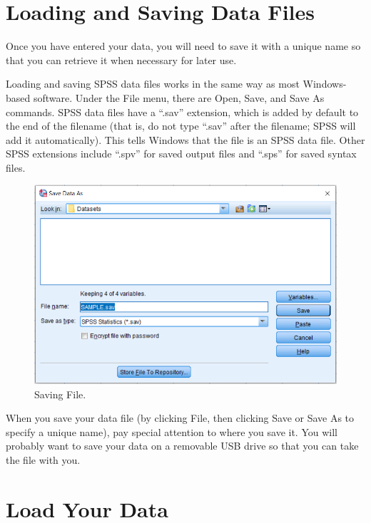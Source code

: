 \documentclass[
]{book}
\begin{document}
\hypertarget{loading-and-saving-data-files}{%
\section{Loading and Saving Data Files}\label{loading-and-saving-data-files}}

Once you have entered your data, you will need to save it with a unique name so that you can retrieve it when necessary for later use.

Loading and saving SPSS data files works in the same way as most Windows-based software. Under the File menu, there are Open, Save, and Save As commands. SPSS data files have a ``.sav'' extension, which is added by default to the end of the filename (that is, do not type ``.sav'' after the filename; SPSS will add it automatically). This tells Windows that the file is an SPSS data file. Other SPSS extensions include ``.spv'' for saved output files and ``.sps'' for saved syntax files.

\begin{figure}
\centering
\includegraphics{Save.png}
\caption{Saving File.}
\end{figure}

When you save your data file (by clicking File, then clicking Save or Save As to specify a unique name), pay special attention to where you save it. You will probably want to save your data on a removable USB drive so that you can take the file with you.

\hypertarget{load-your-data}{%
\section{Load Your Data}\label{load-your-data}}
\end{document}
